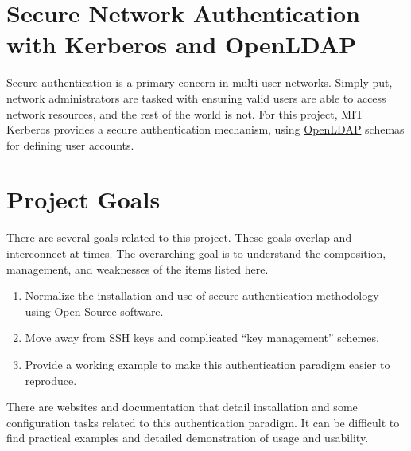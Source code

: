 



\frontmatter{}



\section{\label{sec:intro}Secure Network Authentication with Kerberos and OpenLDAP}
\vspace{2mm}

\justifying
Secure authentication is a primary concern in multi-user networks. Simply put, network administrators are tasked with ensuring 
valid users are able to access network resources, and the rest of the world is not. For this project, MIT Kerberos\cite{krb}\cite{what-is-krb} provides
a secure authentication mechanism, using \href{https://www.openldap.org/}{OpenLDAP} schemas for defining user accounts.

\section{\label{sec:Project}Project Goals}
\vspace{2mm}
\justifying
There are several goals related to this project. These goals overlap and interconnect at times. The overarching goal is to understand the composition,
management, and weaknesses of the items listed here.

\begin{raggedright}
	\begin{enumerate}
		\item Normalize the installation and use of secure authentication methodology using Open Source software.
		\item Move away from SSH keys and complicated ``key management'' schemes.
		\item Provide a working example to make this authentication paradigm easier to reproduce.
	\end{enumerate}
\end{raggedright}
\vspace{2mm}

\justifying
There are websites and documentation that detail installation and some configuration tasks related to this authentication paradigm.
It can be difficult to find practical examples and detailed demonstration of usage and usability. 

